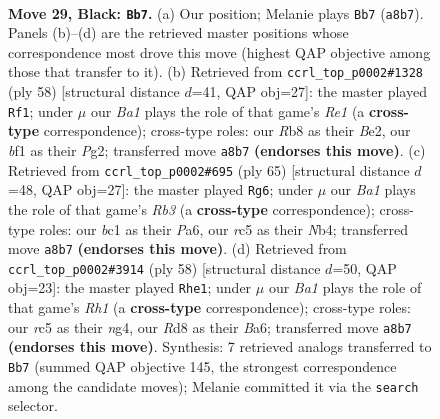 \documentclass[11pt]{article}
\begin{document}
\clearpage

\begin{figure}[p]\centering
\begin{subfigure}{0.46\textwidth}\centering
\resizebox{\linewidth}{!}{%
\newchessgame
\chessboard[
  setfen={br1r4/p2p1pk1/8/2R1p2p/8/5nPP/PP3P2/2BK1B1R b - - 0 29},
  showmover=false,
  pgfstyle=straightmove, color=movearrow, markmove={a8-b7}
]}
\caption{}
\end{subfigure}\hfill
\begin{subfigure}{0.46\textwidth}\centering
\resizebox{\linewidth}{!}{%
\newchessgame
\chessboard[
  setfen={1rbr1k2/5p1p/pP2p3/n2p4/6R1/P4N2/2P1B1PP/2K1R3 w - - 4 30},
  showmover=false,
  pgfstyle=straightmove, color=movearrow, markmove={e1-f1}
]}
\caption{}
\end{subfigure}
\\[4pt]
\begin{subfigure}{0.46\textwidth}\centering
\resizebox{\linewidth}{!}{%
\newchessgame
\chessboard[
  setfen={1r2k3/5pp1/pr6/4P3/1n3p2/RB1PbN1P/1P4P1/1K1R4 b - - 0 33},
  showmover=false,
  pgfstyle=straightmove, color=movearrow, markmove={b6-g6}
]}
\caption{}
\end{subfigure}\hfill
\begin{subfigure}{0.46\textwidth}\centering
\resizebox{\linewidth}{!}{%
\newchessgame
\chessboard[
  setfen={1r3b1r/2k2p2/B3pPpp/8/Pp2N1nP/8/1PP3K1/3R3R w - - 0 30},
  showmover=false,
  pgfstyle=straightmove, color=movearrow, markmove={h1-e1}
]}
\caption{}
\end{subfigure}
\caption{\textbf{Move 29, Black: \texttt{Bb7}.} (a) Our position; Melanie plays \texttt{Bb7} (\texttt{a8b7}). Panels (b)--(d) are the retrieved master positions whose correspondence most drove this move (highest QAP objective among those that transfer to it). (b) Retrieved from \texttt{ccrl\_top\_p0002\#1328} (ply 58) [structural distance $d$=41, QAP obj=27]: the master played \texttt{Rf1}; under $\mu$ our \emph{Ba1} plays the role of that game's \emph{Re1} (a \textbf{cross-type} correspondence); cross-type roles: our \emph{R}b8 as their \emph{B}e2, our \emph{b}f1 as their \emph{P}g2; transferred move \texttt{a8b7} \textbf{(endorses this move)}. (c) Retrieved from \texttt{ccrl\_top\_p0002\#695} (ply 65) [structural distance $d$=48, QAP obj=27]: the master played \texttt{Rg6}; under $\mu$ our \emph{Ba1} plays the role of that game's \emph{Rb3} (a \textbf{cross-type} correspondence); cross-type roles: our \emph{b}c1 as their \emph{P}a6, our \emph{r}c5 as their \emph{N}b4; transferred move \texttt{a8b7} \textbf{(endorses this move)}. (d) Retrieved from \texttt{ccrl\_top\_p0002\#3914} (ply 58) [structural distance $d$=50, QAP obj=23]: the master played \texttt{Rhe1}; under $\mu$ our \emph{Ba1} plays the role of that game's \emph{Rh1} (a \textbf{cross-type} correspondence); cross-type roles: our \emph{r}c5 as their \emph{n}g4, our \emph{R}d8 as their \emph{B}a6; transferred move \texttt{a8b7} \textbf{(endorses this move)}. Synthesis: 7 retrieved analogs transferred to \texttt{Bb7} (summed QAP objective 145, the strongest correspondence among the candidate moves); Melanie committed it via the \texttt{search} selector.}
\label{fig:thought-m57}
\end{figure}
\end{document}
